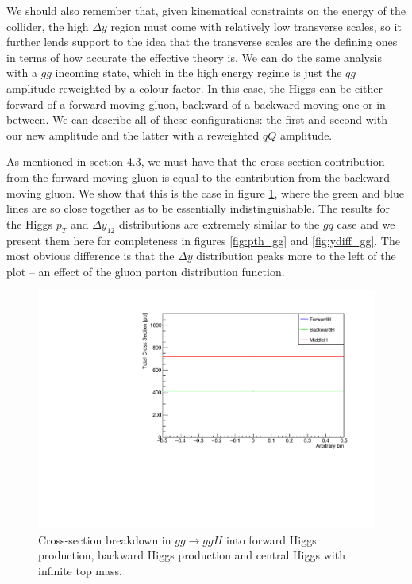 We should also remember that, given kinematical constraints on the energy of the collider, the high $\Delta y$ region must come with relatively low transverse scales, so it further lends support to the idea that the transverse scales are the defining ones in terms of how accurate the effective theory is. We can do the same analysis with a $gg$ incoming state, which in the high energy regime is just the $qg$ amplitude reweighted by a colour factor. In this case, the Higgs can be either forward of a forward-moving gluon, backward of a backward-moving one or in-between. We can describe all of these configurations: the first and second with our new amplitude and the latter with a reweighted $qQ$ amplitude. 

As mentioned in section 4.3, we must have that the cross-section contribution from the forward-moving gluon is equal to the contribution from the backward-moving gluon. We show that this is the case in figure \ref{fig:gg_crosssection}, where the green and blue lines are so close together as to be essentially indistinguishable. The results for the Higgs $p_T$ and $\Delta y_{12}$ distributions are extremely similar to the $gq$ case and we present them here for completeness in figures \ref{fig:pth_gg} and \ref{fig:ydiff_gg}. The most obvious difference is that the $\Delta y$ distribution peaks more to the left of the plot -- an effect of the gluon parton distribution function. 

\begin{figure}[t]
\centering
\includegraphics[scale=0.75]{Images/xsec_breakdown_ggh.pdf}
\caption{Cross-section breakdown in $gg \to ggH$ into forward Higgs production, backward Higgs production and central Higgs with infinite top mass.}
\label{fig:gg_crosssection}
\end{figure}


